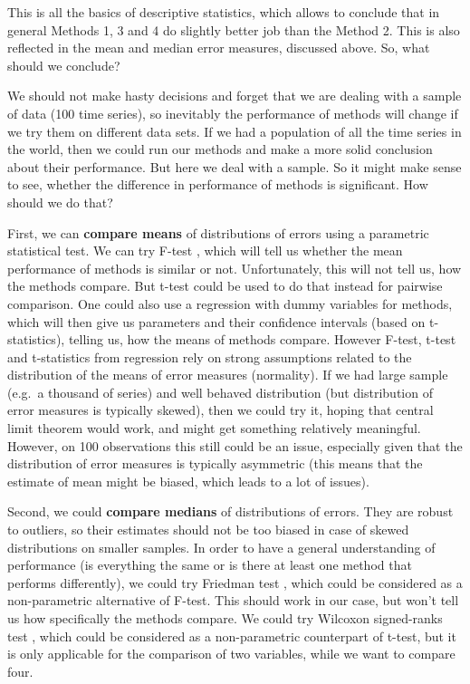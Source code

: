 \documentclass[
]{book}
\theoremstyle{definition}
\theoremstyle{definition}
\theoremstyle{definition}
\theoremstyle{definition}
\theoremstyle{remark}
\begin{document}
This is all the basics of descriptive statistics, which allows to conclude that in general Methods 1, 3 and 4 do slightly better job than the Method 2. This is also reflected in the mean and median error measures, discussed above. So, what should we conclude?

We should not make hasty decisions and forget that we are dealing with a sample of data (100 time series), so inevitably the performance of methods will change if we try them on different data sets. If we had a population of all the time series in the world, then we could run our methods and make a more solid conclusion about their performance. But here we deal with a sample. So it might make sense to see, whether the difference in performance of methods is significant. How should we do that?

First, we can \textbf{compare means} of distributions of errors using a parametric statistical test. We can try F-test \citep{WikipediaFTest}, which will tell us whether the mean performance of methods is similar or not. Unfortunately, this will not tell us, how the methods compare. But t-test \citep{WikipediaTTest} could be used to do that instead for pairwise comparison. One could also use a regression with dummy variables for methods, which will then give us parameters and their confidence intervals (based on t-statistics), telling us, how the means of methods compare. However F-test, t-test and t-statistics from regression rely on strong assumptions related to the distribution of the means of error measures (normality). If we had large sample (e.g.~a thousand of series) and well behaved distribution (but distribution of error measures is typically skewed), then we could try it, hoping that central limit theorem would work, and might get something relatively meaningful. However, on 100 observations this still could be an issue, especially given that the distribution of error measures is typically asymmetric (this means that the estimate of mean might be biased, which leads to a lot of issues).

Second, we could \textbf{compare medians} of distributions of errors. They are robust to outliers, so their estimates should not be too biased in case of skewed distributions on smaller samples. In order to have a general understanding of performance (is everything the same or is there at least one method that performs differently), we could try Friedman test \citep{WikipediaFriedmanTest}, which could be considered as a non-parametric alternative of F-test. This should work in our case, but won't tell us how specifically the methods compare. We could try Wilcoxon signed-ranks test \citep{WikipediaWilcoxonTest}, which could be considered as a non-parametric counterpart of t-test, but it is only applicable for the comparison of two variables, while we want to compare four.
\end{document}
